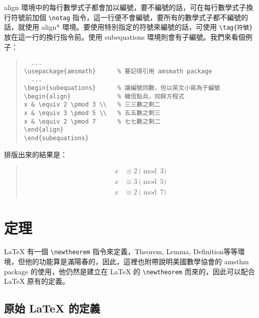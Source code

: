 {\ttfamily align} 環境中的每行數學式子都會加以編號，要不編號的話，可在每行數學式子換行符號前加個 \verb|\notag| 指令，這一行便不會編號，要所有的數學式子都不編號的話，就使用 {\ttfamily align*} 環境。要使用特別指定的符號來編號的話，可使用 \verb|\tag{符號}| 放在這一行的換行指令前。使用 {\ttfamily subequations} 環境則會有子編號。我們來看個例子：

\begin{quote}
  \begin{verbatim}
  ...
\usepackage{amsmath}      % 要記得引用 amsmath package
  ...
\begin{subequations}      % 讓編號同數，但以英文小寫為子編號
\begin{align}             % 韓信點兵，同餘方程式
x & \equiv 2 \pmod 3 \\   % 三三數之剩二
x & \equiv 3 \pmod 5 \\   % 五五數之剩三
x & \equiv 2 \pmod 7      % 七七數之剩二
\end{align}
\end{subequations}
\end{verbatim}
\end{quote}

排版出來的結果是：
\begin{quote}
  \begin{subequations}
    \begin{align}
      x & \equiv 2 \pmod 3 \\
      x & \equiv 3 \pmod 5 \\
      x & \equiv 2 \pmod 7
    \end{align}
  \end{subequations}
\end{quote}


\section{定理}

\LaTeX{} 有一個 \verb|\newtheorem| 指令來定義，Theorem, Lemma, Definition\chdots{}等等環境，但他的功能算是滿陽春的，因此，這裡也附帶說明美國數學協會的 {\sffamily amsthm} package 的使用，他仍然是建立在 \LaTeX{} 的 \verb|\newtheorem| 而來的，因此可以配合 \LaTeX{} 原有的定義。

\subsection{原始 \LaTeX{} 的定義}

